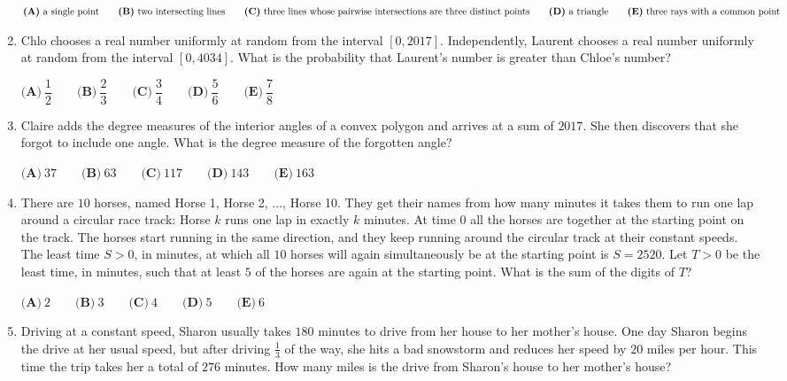 \documentclass{article}
\begin{document}
\begin{enumerate}[label=\arabic*., itemsep=0.5em]
\( \textbf{(A)}\ \text{a single point} \qquad\textbf{(B)}\ \text{two intersecting lines} \\ \qquad\textbf{(C)}\ \text{three lines whose pairwise intersections are three distinct points} \\ \qquad\textbf{(D)}\ \text{a triangle}\qquad\textbf{(E)}\ \text{three rays with a common point} \)\par \vspace{0.5em}\item Chlo chooses a real number uniformly at random from the interval \( [ 0,2017 ]\). Independently, Laurent chooses a real number uniformly at random from the interval \([ 0 , 4034 ]\). What is the probability that Laurent's number is greater than Chloe's number?  

\( \textbf{(A)}\ \dfrac{1}{2} \qquad\textbf{(B)}\ \dfrac{2}{3} \qquad\textbf{(C)}\ \dfrac{3}{4} \qquad\textbf{(D)}\ \dfrac{5}{6} \qquad\textbf{(E)}\ \dfrac{7}{8} \)\par \vspace{0.5em}\item Claire adds the degree measures of the interior angles of a convex polygon and arrives at a sum of \(2017\). She then discovers that she forgot to include one angle. What is the degree measure of the forgotten angle?

\(\textbf{(A)}\ 37\qquad\textbf{(B)}\ 63\qquad\textbf{(C)}\ 117\qquad\textbf{(D)}\ 143\qquad\textbf{(E)}\ 163\)\par \vspace{0.5em}\item There are \(10\) horses, named Horse 1, Horse 2, \(\ldots\), Horse 10. They get their names from how many minutes it takes them to run one lap around a circular race track: Horse \(k\) runs one lap in exactly \(k\) minutes. At time 0 all the horses are together at the starting point on the track. The horses start running in the same direction, and they keep running around the circular track at their constant speeds. The least time \(S > 0\), in minutes, at which all \(10\) horses will again simultaneously be at the starting point is \(S = 2520\). Let  \(T>0\) be the least time, in minutes, such that at least \(5\) of the horses are again at the starting point. What is the sum of the digits of  \(T\)?

\(\textbf{(A)}\ 2\qquad\textbf{(B)}\ 3\qquad\textbf{(C)}\ 4\qquad\textbf{(D)}\ 5\qquad\textbf{(E)}\ 6\)\par \vspace{0.5em}\item Driving at a constant speed, Sharon usually takes \(180\) minutes to drive from her house to her mother's house. One day Sharon begins the drive at her usual speed, but after driving \(\frac{1}{3}\) of the way, she hits a bad snowstorm and reduces her speed by \(20\) miles per hour. This time the trip takes her a total of \(276\) minutes. How many miles is the drive from Sharon's house to her mother's house?


\end{enumerate}
\end{document}
